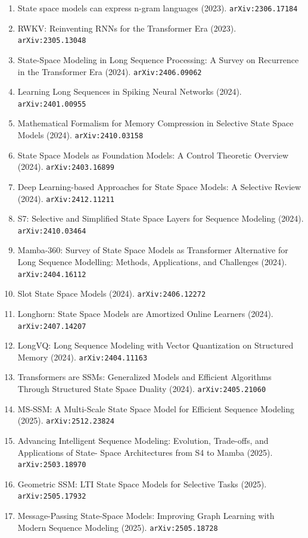 \documentclass[11pt]{article}
\begin{document}
\begin{enumerate}
  Stable Reparameterization (2023). \texttt{arXiv:2311.14495}
  \item State space models can express n-gram languages (2023). \texttt{arXiv:2306.17184}
  \item RWKV: Reinventing RNNs for the Transformer Era (2023). \texttt{arXiv:2305.13048}
  \item State-Space Modeling in Long Sequence Processing: A Survey on Recurrence in the Transformer Era (2024). \texttt{arXiv:2406.09062}
  \item Learning Long Sequences in Spiking Neural Networks (2024). \texttt{arXiv:2401.00955}
  \item Mathematical Formalism for Memory Compression in Selective State Space
  Models (2024). \texttt{arXiv:2410.03158}
  \item State Space Models as Foundation Models: A Control Theoretic Overview (2024). \texttt{arXiv:2403.16899}
  \item Deep Learning-based Approaches for State Space Models: A Selective
  Review (2024). \texttt{arXiv:2412.11211}
  \item S7: Selective and Simplified State Space Layers for Sequence Modeling (2024). \texttt{arXiv:2410.03464}
  \item Mamba-360: Survey of State Space Models as Transformer Alternative for
  Long Sequence Modelling: Methods, Applications, and Challenges (2024). \texttt{arXiv:2404.16112}
  \item Slot State Space Models (2024). \texttt{arXiv:2406.12272}
  \item Longhorn: State Space Models are Amortized Online Learners (2024). \texttt{arXiv:2407.14207}
  \item LongVQ: Long Sequence Modeling with Vector Quantization on Structured
  Memory (2024). \texttt{arXiv:2404.11163}
  \item Transformers are SSMs: Generalized Models and Efficient Algorithms
  Through Structured State Space Duality (2024). \texttt{arXiv:2405.21060}
  \item MS-SSM: A Multi-Scale State Space Model for Efficient Sequence Modeling (2025). \texttt{arXiv:2512.23824}
  \item Advancing Intelligent Sequence Modeling: Evolution, Trade-offs, and Applications of State- Space Architectures from S4 to Mamba (2025). \texttt{arXiv:2503.18970}
  \item Geometric SSM: LTI State Space Models for Selective Tasks (2025). \texttt{arXiv:2505.17932}
  \item Message-Passing State-Space Models: Improving Graph Learning with Modern Sequence Modeling (2025). \texttt{arXiv:2505.18728}

\end{enumerate}
\end{document}
